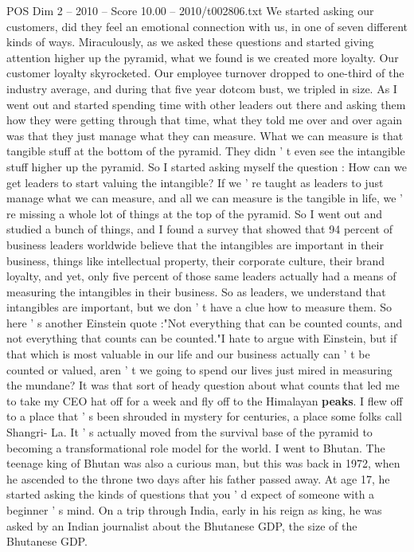 \begin{textsample}{POS Dim 2 – 2010 – Score 10.00 – 2010/t002806.txt}
We started asking our customers, did they feel an emotional connection with us, in one of seven different kinds of ways.
Miraculously, as we asked these questions and started giving attention higher up the pyramid, what we found is we created more loyalty.
Our customer loyalty skyrocketed.
Our employee turnover dropped to one-third of the industry average, and during that five year dotcom bust, we tripled in size.
As I went out and started spending time with other leaders out there and asking them how they were getting through that time, what they told me over and over again was that they just manage what they can measure.
What we can measure is that tangible stuff at the bottom of the pyramid.
They didn ' t even see the intangible stuff higher up the pyramid.
So I started asking myself the question : How can we get leaders to start valuing the intangible?
If we ' re taught as leaders to just manage what we can measure, and all we can measure is the tangible in life, we ' re missing a whole lot of things at the top of the pyramid.
So I went out and studied a bunch of things, and I found a survey that showed that 94 percent of business leaders worldwide believe that the intangibles are important in their business, things like intellectual property, their corporate culture, their brand loyalty, and yet, only five percent of those same leaders actually had a means of measuring the intangibles in their business.
So as leaders, we understand that intangibles are important, but we don ' t have a clue how to measure them.
So here ' s another Einstein quote :"Not everything that can be counted counts, and not everything that counts can be counted."I hate to argue with Einstein, but if that which is most valuable in our life and our business actually can ' t be counted or valued, aren ' t we going to spend our lives just mired in measuring the mundane?
It was that sort of heady question about what counts that led me to take my CEO hat off for a week and fly off to the Himalayan \textbf{peaks}.
I flew off to a place that ' s been shrouded in mystery for centuries, a place some folks call Shangri- La.
It ' s actually moved from the survival base of the pyramid to becoming a transformational role model for the world.
I went to Bhutan.
The teenage king of Bhutan was also a curious man, but this was back in 1972, when he ascended to the throne two days after his father passed away.
At age 17, he started asking the kinds of questions that you ' d expect of someone with a beginner ' s mind.
On a trip through India, early in his reign as king, he was asked by an Indian journalist about the Bhutanese GDP, the size of the Bhutanese GDP.

\end{textsample}
